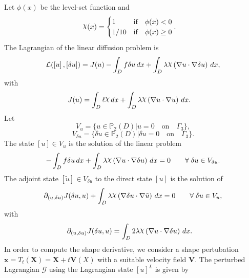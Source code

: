 \documentclass[preview]{standalone}
\let\oldcdot\cdot
\let\cdot\oldcdot
\begin{document}
Let $\phi(x)$ be the level-set function and
 \begin{align*}\raisebox{\depth}{$\chi$}(x) &= \begin{cases} 1 & \mbox{if}\quad \phi(x) < 0 \\ 1/10 & \mbox{if}\quad \phi(x)  \ge 0 \end{cases}.\end{align*}
The Lagrangian of the linear diffusion problem is
\begin{dmath*}
\mathcal L(\left[ u\right],\left[ \delta u\right]) = J(u) -  \int_{D} f \delta u \,dx +  \int_{D} \lambda \raisebox{\depth}{$\chi$} \left(  \nabla u  \cdot  \nabla \delta u  \right) \,dx , 
\end{dmath*}
with 
\begin{align*}
J(u) &=  \int_{D} \ell \raisebox{\depth}{$\chi$} \,dx +  \int_{D} \lambda \raisebox{\depth}{$\chi$} \left(  \nabla u  \cdot  \nabla u  \right) \,dx.
 \end{align*}
Let
\begin{equation*}
V_{u} = \{ u \in \mathbb P_{2}(D)| u = 0  \quad \text{{on}} \quad\Gamma_{3} \},\end{equation*}
\begin{equation*}
V_{\delta u} = \{ \delta u \in \mathbb P_{2}(D)| \delta u = 0  \quad \text{{on}} \quad\Gamma_{3} \}.\end{equation*}
The state $\left[ u\right] \in  V_{u}$ is the solution of the linear problem
\begin{dmath*}
-  \int_{D} f \delta u \,dx +  \int_{D} \lambda \raisebox{\depth}{$\chi$} \left(  \nabla u  \cdot  \nabla \delta u  \right) \,dx = 0\qquad \forall\; {\delta u\in V_{\delta u}} . 
\end{dmath*}
The adjoint state $\left[ \tilde u\right] \in  V_{\delta u}$ to the direct state $\left[ u\right]$ is the solution of
\begin{dmath*}
\partial_{(u,\delta u)} J(\delta u,u) +  \int_{D} \lambda \raisebox{\depth}{$\chi$} \left(  \nabla \delta u  \cdot  \nabla \tilde u  \right) \,dx = 0\qquad \forall\; {\delta u\in V_{u}} , 
\end{dmath*}
with 
\begin{align*}
\partial_{(u,\delta u)} J(\delta u,u) &=  \int_{D} 2 \lambda \raisebox{\depth}{$\chi$} \left(  \nabla u  \cdot  \nabla \delta u  \right) \,dx.
 \end{align*}
In order to compute the shape derivative, we consider a shape pertubation $\mathbf x = T_t(\mathbf X) = \mathbf X + t \mathbf  V(X)$ with a suitable velocity field $\mathbf V$. The perturbed Lagrangian $\mathcal G$ using the Lagrangian state $\left[ u\right]^{L}$ is given by
\end{document}

